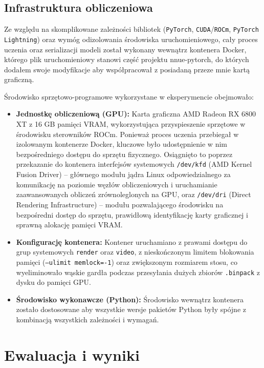 \documentclass[12pt,a4paper]{report}
\begin{document}
\section{Infrastruktura obliczeniowa}

Ze względu na skomplikowane zależności bibliotek (\texttt{PyTorch}, \texttt{CUDA}/\texttt{ROCm}, \texttt{PyTorch Lightning}) oraz wymóg odizolowania środowiska uruchomieniowego, cały proces uczenia oraz serializacji modeli został wykonany wewnątrz kontenera Docker, którego plik uruchomieniowy stanowi część projektu nnue-pytorch, do których dodałem swoje modyfikacje aby współpracował z posiadaną przeze mnie kartą graficzną.

Środowisko sprzętowo-programowe wykorzystane w eksperymencie obejmowało:

\begin{itemize}
    \item \textbf{Jednostkę obliczeniową (GPU):} Karta graficzna AMD Radeon RX 6800 XT z 16 GB pamięci VRAM, wykorzystująca przyspieszenie sprzętowe w środowisku sterowników ROCm. Ponieważ proces uczenia przebiegał w izolowanym kontenerze Docker, kluczowe było udostępnienie w nim bezpośredniego dostępu do sprzętu fizycznego. Osiągnięto to poprzez przekazanie do kontenera interfejsów systemowych \texttt{/dev/kfd} (AMD Kernel Fusion Driver) -- głównego modułu jądra Linux odpowiedzialnego za komunikację na poziomie węzłów obliczeniowych i uruchamianie zaawansowanych obliczeń zrównoleglonych na GPU, oraz \texttt{/dev/dri} (Direct Rendering Infrastructure) -- modułu pozwalającego środowisku na bezpośredni dostęp do sprzętu, prawidłową identyfikację karty graficznej i sprawną alokację pamięci VRAM.
    \item \textbf{Konfigurację kontenera:} Kontener uruchamiano z prawami dostępu do grup systemowych \texttt{render} oraz \texttt{video}, z nieskończonym limitem blokowania pamięci (\texttt{--ulimit memlock=-1}) oraz zwiększonym rozmiarem stosu, co wyeliminowało wąskie gardła podczas przesyłania dużych zbiorów \texttt{.binpack} z dysku do pamięci GPU.
    \item \textbf{Środowisko wykonawcze (Python):} Środowisko wewnątrz kontenera zostało dostosowane aby wszystkie wersje pakietów Python były spójne z kombinacją wszystkich zależności i wymagań.
\end{itemize}

\chapter{Ewaluacja i wyniki}
\end{document}
